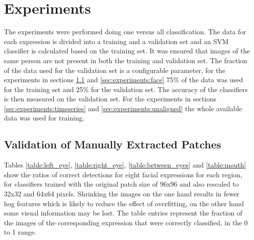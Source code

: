 \section{Experiments}\label{sec:experiments}

The experiments were performed doing one versus all classification. The data for each expression is divided into a training and a validation set and an SVM classifier is calculated based on the training set. It was ensured that images of the same person are not present in both the training and validation set. The fraction of the data used for the validation set is a configurable parameter, for the experiments in sections \ref{sec:experiments:manual} and \ref{sec:experiments:face} 75\% of the data was used for the training set and 25\% for the validation set. The accuracy of the classifiers is then measured on the validation set. For the experiments in sections \ref{sec:experiments:timeseries} and \ref{sec:experiments:unaligned} the whole available data was used for training.

\subsection{Validation of Manually Extracted Patches}\label{sec:experiments:manual}
Tables \ref{table:left_eye}, \ref{table:right_eye}, \ref{table:between_eyes} and \ref{table:mouth} show the ratios of correct detections for eight facial expressions for each region, for classifiers trained with the original patch size of 96x96 and also rescaled to 32x32 and 64x64 pixels. Shrinking the images on the one hand results in fewer hog features which is likely to reduce the effect of overfitting, on the other hand some visual information may be lost. The table entries represent the fraction of the images of the corresponding expression that were correctly classified, in the 0 to 1 range.



